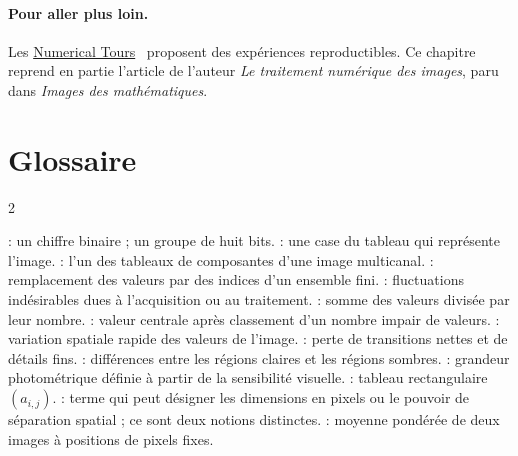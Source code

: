 \paragraph*{Pour aller plus loin.}
Les \href{https://www.numerical-tours.com/}{Numerical Tours}~\cite{2011-peyre-cise} proposent des expériences reproductibles. Ce chapitre reprend en partie l'article de l'auteur \emph{Le traitement numérique des images}, paru dans \emph{Images des mathématiques}.

\ifdefined\StandaloneChapter
\par\noindent\begin{minipage}{\linewidth}
\section*{Glossaire}
\begin{multicols}{2}\small\raggedright
\begin{rs}
 : un chiffre binaire ; un groupe de huit bits.
 : une case du tableau qui représente l'image.
 : l'un des tableaux de composantes d'une image multicanal.
 : remplacement des valeurs par des indices d'un ensemble fini.
 : fluctuations indésirables dues à l'acquisition ou au traitement.
 : somme des valeurs divisée par leur nombre.
 : valeur centrale après classement d'un nombre impair de valeurs.
 : variation spatiale rapide des valeurs de l'image.
 : perte de transitions nettes et de détails fins.
 : différences entre les régions claires et les régions sombres.
 : grandeur photométrique définie à partir de la sensibilité visuelle.
 : tableau rectangulaire $(a_{i,j})$.
 : terme qui peut désigner les dimensions en pixels ou le pouvoir de séparation spatial ; ce sont deux notions distinctes.
 : moyenne pondérée de deux images à positions de pixels fixes.
\end{rs}
\end{multicols}
\end{minipage}\par
\fi
